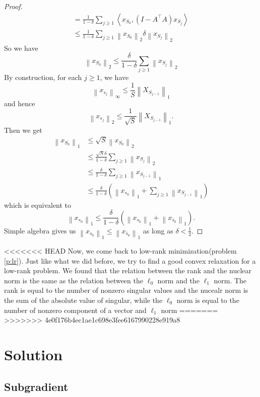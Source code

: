 \documentclass[11pt]{article}
\begin{document}
\begin{problem}
\begin{proof}
$$\begin{aligned}
& =\frac{1}{1-\delta} \sum_{j \geqslant 1}\left\langle x_{S_{0}},\left(I-A^{\top} A\right) x_{S_{j}}\right\rangle & \\
& \leqslant \frac{1}{1-\delta} \sum_{j \geqslant 1}\left\|x_{S_{0}}\right\|_{2} \delta\left\|x_{S_{j}}\right\|_{2} & 
\end{aligned}
$$
So we have
$$
\left\|x_{S_{0}}\right\|_{2} \leqslant \frac{\delta}{1-\delta} \sum_{j \geqslant 1}\left\|x_{S_{j}}\right\|_{2}
$$
By construction, for each $j \geqslant 1$, we have
$$
\left\|x_{s_{j}}\right\|_{\infty} \leqslant \frac{1}{S}\left\|X_{S_{j-1}}\right\|_{1}
$$
and hence
$$
\left\|x_{s_{j}}\right\|_{2} \leqslant \frac{1}{\sqrt{S}}\left\|X_{S_{j-1}}\right\|_{1} .
$$
Then we get
$$
\begin{aligned}
\left\|x_{S_{0}}\right\|_{1} & \leqslant \sqrt{S}\left\|x_{S_{0}}\right\|_{2} \\
& \leqslant \frac{\sqrt{S} \delta}{1-\delta} \sum_{j \geqslant 1}\left\|x_{S_{j}}\right\|_{2} \\
& \leqslant \frac{\delta}{1-\delta} \sum_{j \geqslant 1}\left\|x_{S_{j-1}}\right\|_{1} \\
& \leqslant \frac{\delta}{1-\delta}\left(\left\|x_{s_{0}}\right\|_{1}+\sum_{j \geqslant 1}\left\|x_{S_{j-1}}\right\|_{1}\right)
\end{aligned}
$$
which is equivalent to
$$
\left\|x_{s_{0}}\right\|_{1} \leqslant \frac{\delta}{1-\delta}\left(\left\|x_{s_{0}}\right\|_{1}+\left\|x_{\bar{s}_{0}}\right\|_{1}\right) .
$$
Simple algebra gives us $\left\|x_{s_{0}}\right\|_{1} \leqslant\left\|x_{\bar{s}_{0}}\right\|_{1}$ as long as $\delta<\frac{1}{2}$.
\end{proof}

<<<<<<< HEAD
Now, we come back to low-rank minimization(problem \ref{p:lr}). Just like what we did before, we try to find a good convex relaxation for a low-rank problem. 
We found that the relation between the rank and the nuclear norm  is the same as the relation between the \(\ell_0\) norm and the \(\ell_1\) norm. The rank is equal to the number of nonzero singular values and the nucealr norm is the sum of the absolute value of singular, while the \(\ell_0\) norm is equal to the number of nonzero component of a vector and \(\ell_1\) norm
=======
>>>>>>> 4e0f176b4ec1ae1c698e3fee6167990228e919a8
\section{Solution}

\subsection{Subgradient}


\end{problem}
\end{document}
